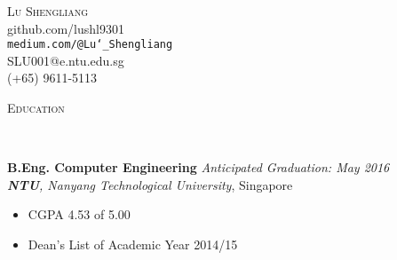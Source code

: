 \documentclass[a4paper, 12pt]{article}
\newenvironment{changemargin}[2]{%
  \begin{list}{}{%
      \setlength{\topsep}{0pt}%
      \setlength{\leftmargin}{#1}%
      \setlength{\rightmargin}{#2}%
      \setlength{\listparindent}{\parindent}%
      \setlength{\itemindent}{\parindent}%
      \setlength{\parsep}{\parskip}%
    }%
  \item[]}{\end{list}
}
\newcommand{\lineover}{
  \begin{changemargin}{-0.05in}{-0.05in}
    \vspace*{-8pt}
    \hrulefill \\
    \vspace*{-2pt}
  \end{changemargin}
}
\newcommand{\header}[1]{
  \begin{changemargin}{-0.5in}{-0.5in}
    \scshape{#1}\\
    \lineover
  \end{changemargin}
}
\newcommand{\contact}[5]{
  \begin{changemargin}{-0.5in}{-0.5in}
    \begin{center}
      {\LARGE \scshape {#1}}\\ \smallskip
      {#2}\\ \smallskip
      {#3}\\ \smallskip
      {#4}\\ \smallskip
      {#5}   \smallskip
    \end{center}
  \end{changemargin}
}
\newenvironment{body}
{
\vspace*{-16pt}
\begin{changemargin}{-0.25in}{-0.5in}
}	
{
\end{changemargin}
}
\begin{document}
\contact{Lu Shengliang}{github.com/lushl9301}{\texttt{medium.com/@Lu\char`_Shengliang}}{SLU001@e.ntu.edu.sg}{(+65) 9611-5113}





\header{Education}

\begin{body}
  \vspace{14pt}
  \textbf{B.Eng. Computer Engineering} \hfill \emph{Anticipated Graduation: May 2016} \\
  \emph{\textbf{NTU}, Nanyang Technological University}, Singapore\\
  \begin{itemize} \itemsep -0pt  \small
  \item CGPA 4.53 of 5.00
  \item Dean's List of Academic Year 2014/15
  \end{itemize} 
\end{body}
\end{document}
